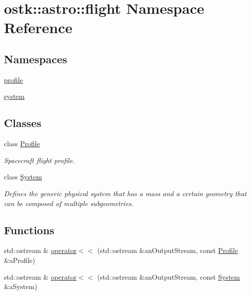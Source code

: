 \hypertarget{namespaceostk_1_1astro_1_1flight}{}\section{ostk\+:\+:astro\+:\+:flight Namespace Reference}
\label{namespaceostk_1_1astro_1_1flight}
\subsection*{Namespaces}
\begin{DoxyCompactItemize}
\item 
 \hyperlink{namespaceostk_1_1astro_1_1flight_1_1profile}{profile}
\item 
 \hyperlink{namespaceostk_1_1astro_1_1flight_1_1system}{system}
\end{DoxyCompactItemize}
\subsection*{Classes}
\begin{DoxyCompactItemize}
\item 
class \hyperlink{classostk_1_1astro_1_1flight_1_1_profile}{Profile}
\begin{DoxyCompactList}\small\item\em Spacecraft flight profile. \end{DoxyCompactList}\item 
class \hyperlink{classostk_1_1astro_1_1flight_1_1_system}{System}
\begin{DoxyCompactList}\small\item\em Defines the generic physical system that has a mass and a certain geometry that can be composed of multiple subgeometries. \end{DoxyCompactList}\end{DoxyCompactItemize}
\subsection*{Functions}
\begin{DoxyCompactItemize}
\item 
std\+::ostream \& \hyperlink{namespaceostk_1_1astro_1_1flight_ad4a6bc77a55e55a29abdc5b4e3d8a346}{operator$<$$<$} (std\+::ostream \&an\+Output\+Stream, const \hyperlink{classostk_1_1astro_1_1flight_1_1_profile}{Profile} \&a\+Profile)
\item 
std\+::ostream \& \hyperlink{namespaceostk_1_1astro_1_1flight_a634c76052b78e11d9f56d11ac989fc20}{operator$<$$<$} (std\+::ostream \&an\+Output\+Stream, const \hyperlink{classostk_1_1astro_1_1flight_1_1_system}{System} \&a\+System)
\end{DoxyCompactItemize}


